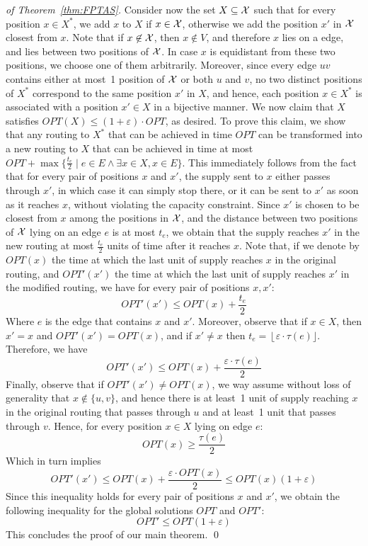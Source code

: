 \documentclass[a4paper,10pt]{llncs}
\begin{document}
\begin{proof}[of Theorem~\ref{thm:FPTAS}]
Consider now the set $X\subseteq {\cal X}$ such that for every position $x\in X^*$, we add $x$ to $X$ if $x\in{\cal X}$, otherwise we add the position $x'$ in ${\cal X}$ closest from $x$. Note that if $x\not\in {\cal X}$, then $x\not\in V$, and therefore $x$ lies on a edge, and lies between two positions of ${\cal X}$. In case $x$ is equidistant from these two positions, we choose one of them arbitrarily. Moreover, since every edge $uv$ contains either at most~1 position of ${\cal X}$ or both $u$ and $v$, no two distinct positions of $X^*$ correspond to the same position $x'$ in $X$, and hence, each position $x\in X^*$ is associated with a position $x'\in X$ in a bijective manner.
We now claim that $X$ satisfies $OPT(X)\leq(1+\varepsilon)\cdot OPT$, as desired.
To prove this claim, we show that any routing to $X^*$ that can be achieved in time $OPT$ can be transformed into a new routing to $X$ that can be achieved in time at most $OPT+\max\{\frac{t_e}{2} \mid e\in E \wedge \exists x\in X, x\in E\}$. This immediately follows from the fact that for every pair of positions $x$ and $x'$, the supply sent to $x$ either passes through $x'$, in which case it can simply stop there, or it can be sent to $x'$ as soon as it reaches $x$, without violating the capacity constraint. Since $x'$ is chosen to be closest from $x$ among the positions in ${\cal X}$, and the distance between two positions of ${\cal X}$ lying on an edge $e$ is at most $t_e$, we obtain that the supply reaches $x'$ in the new routing at most $\frac{t_e}{2}$ units of time after it reaches $x$. Note that, if we denote by $OPT(x)$ the time at which the last unit of supply reaches $x$ in the original routing, and $OPT'(x')$ the time at which the last unit of supply reaches $x'$ in the modified routing, we have for every pair of positions $x,x'$:
\[OPT'(x') \leq OPT(x)+\frac{t_e}{2}\]
Where $e$ is the edge that contains $x$ and $x'$. Moreover, observe that if $x\in X$, then $x'=x$ and $OPT'(x')=OPT(x)$, and if $x'\neq x$ then $t_e = \left\lfloor\varepsilon\cdot \tau(e)\rfloor\right.$.
Therefore, we have
\[OPT'(x')\leq OPT(x) + \frac{\varepsilon\cdot \tau(e)}{2}\]
Finally, observe that if $OPT'(x')\neq OPT(x)$, we way assume without loss of generality that $x\not\in \{u,v\}$, and hence there is at least~1 unit of supply reaching $x$ in the original routing that passes through $u$ and at least~1 unit that passes through $v$. Hence, for every position $x\in X$ lying on edge $e$:
\[OPT(x) \geq \frac{\tau(e)}{2}\]
Which in turn implies
\[OPT'(x') \leq OPT(x) + \frac{\varepsilon \cdot OPT(x)}{2} \leq OPT(x)(1+\varepsilon)\]
Since this inequality holds for every pair of positions $x$ and $x'$, we obtain the following inequality for the global solutions $OPT$ and $OPT'$:
\[OPT'\leq OPT(1+\varepsilon)\]
This concludes the proof of our main theorem.
\qed
\end{proof}
\end{document}
